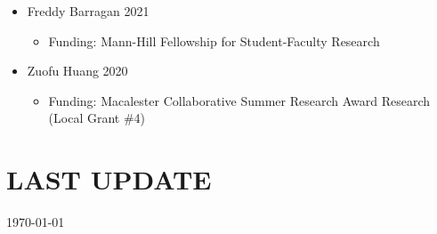 \documentclass[margin]{res}
\begin{document}
\begin{resume}
\begin{itemize}
\item Freddy Barragan \hfill 2021 
	\begin{itemize}\vspace{-0.1cm}
	\item[]\begin{footnotesize}Funding: Mann-Hill Fellowship for Student-Faculty Research\end{footnotesize}
	\end{itemize}

\item Zuofu Huang \hfill 2020 
	\begin{itemize}\vspace{-0.1cm}
	\item[]\begin{footnotesize}Funding: Macalester Collaborative Summer Research Award Research (Local Grant \#4)  \end{footnotesize}
	\end{itemize}
\end{itemize}

	

	
		


			
\section{LAST UPDATE} \today

\end{resume}
\end{document}
